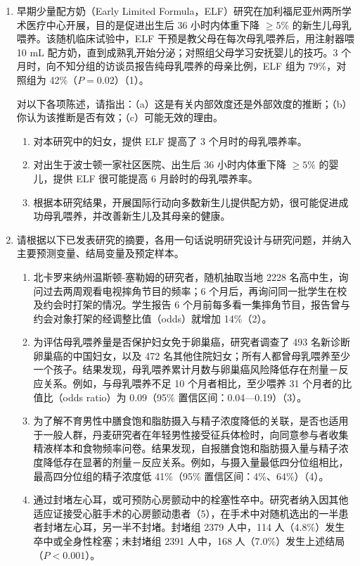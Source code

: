 \begin{enumerate}
\item 早期少量配方奶（Early Limited Formula，ELF）研究在加利福尼亚州两所学术医疗中心开展，目的是促进出生后 36 小时内体重下降 $\geq5\%$ 的新生儿母乳喂养。该随机临床试验中，ELF 干预是教父母在每次母乳喂养后，用注射器喂 10 mL 配方奶，直到成熟乳开始分泌；对照组父母学习安抚婴儿的技巧。3 个月时，向不知分组的访谈员报告纯母乳喂养的母亲比例，ELF 组为 79\%，对照组为 42\%（$P=0.02$）（1）。

对以下各项陈述，请指出：（a）这是有关内部效度还是外部效度的推断；（b）你认为该推断是否有效；（c）可能无效的理由。
\begin{enumerate}
\item 对本研究中的妇女，提供 ELF 提高了 3 个月时的母乳喂养率。
\item 对出生于波士顿一家社区医院、出生后 36 小时内体重下降 $\geq5\%$ 的婴儿，提供 ELF 很可能提高 6 月龄时的母乳喂养率。
\item 根据本研究结果，开展国际行动向多数新生儿提供配方奶，很可能促进成功母乳喂养，并改善新生儿及其母亲的健康。
\end{enumerate}
\item 请根据以下已发表研究的摘要，各用一句话说明研究设计与研究问题，并纳入主要预测变量、结局变量及预定样本。
\begin{enumerate}
\item 北卡罗来纳州温斯顿-塞勒姆的研究者，随机抽取当地 2228 名高中生，询问过去两周观看电视摔角节目的频率；6 个月后，再询问同一批学生在校及约会时打架的情况。学生报告 6 个月前每多看一集摔角节目，报告曾与约会对象打架的经调整比值（odds）就增加 14\%（2）。
\item 为评估母乳喂养量是否保护妇女免于卵巢癌，研究者调查了 493 名新诊断卵巢癌的中国妇女，以及 472 名其他住院妇女；所有人都曾母乳喂养至少一个孩子。结果发现，母乳喂养累计月数与卵巢癌风险降低存在剂量－反应关系。例如，与母乳喂养不足 10 个月者相比，至少喂养 31 个月者的比值比（odds ratio）为 0.09（95\% 置信区间：0.04—0.19）（3）。
\item 为了解不育男性中膳食饱和脂肪摄入与精子浓度降低的关联，是否也适用于一般人群，丹麦研究者在年轻男性接受征兵体检时，向同意参与者收集精液样本和食物频率问卷。结果发现，自报膳食饱和脂肪摄入量与精子浓度降低存在显著的剂量－反应关系。例如，与摄入量最低四分位组相比，最高四分位组的精子浓度低 41\%（95\% 置信区间：4\%、64\%）（4）。
\item 通过封堵左心耳，或可预防心房颤动中的栓塞性卒中。研究者纳入因其他适应证接受心脏手术的心房颤动患者（5），在手术中对随机选出的一半患者封堵左心耳，另一半不封堵。封堵组 2379 人中，114 人（4.8\%）发生卒中或全身性栓塞；未封堵组 2391 人中，168 人（7.0\%）发生上述结局（$P<0.001$）。
\end{enumerate}
\end{enumerate}

